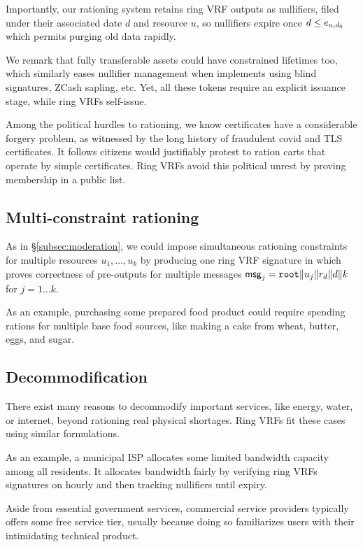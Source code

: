 Importantly, our rationing system retains ring VRF outputs as nullifiers,
filed under their associated date $d$ and resource $u$, so nullifiers
expire once $d \le e_{u,d_0}$ which permits purging old data rapidly.

We remark that fully transferable assets could have constrained lifetimes
too, which similarly eases nullifier management when implements using
blind signatures, ZCash sapling, etc.  Yet, all these tokens require
an explicit issuance stage, while ring VRFs self-issue.

Among the political hurdles to rationing, we know certificates have
a considerable forgery problem, as witnessed by the long history of
fraudulent covid and TLS certificates.  It follows citizens would
justifiably protest to ration carts that operate by simple certificates.
Ring VRFs avoid this political unrest by proving membership in a public list.


\subsection{Multi-constraint rationing}
\label{subsec:multi_io}

As in \S\ref{subsec:moderation}, we could impose simultaneous rationing
constraints for multiple resources $u_1,\ldots,u_k$ by producing one
ring VRF signature in which \PedVRF proves correctness of pre-outputs
for multiple messages 
 $\mathsf{msg}_j = \mathtt{root} \| u_j \| r_d \| d \| k$ for $j=1 \ldots k$.

As an example, purchasing some prepared food product could require spending
rations for multiple base food sources, like making a cake from wheat, butter,
eggs, and sugar.  


\subsection{Decommodification}

There exist many reasons to decommodify important services, like
energy, water, or internet, beyond rationing real physical shortages.
Ring VRFs fit these cases using similar \msg formulations.

As an example, a municipal ISP allocates some limited bandwidth capacity
among all residents.  It allocates bandwidth fairly by verifying ring VRFs
signatures on hourly \msg and then tracking nullifiers until expiry.

Aside from essential government services, commercial service providers
typically offers some free service tier, usually because doing so
familiarizes users with their intimidating technical product.

